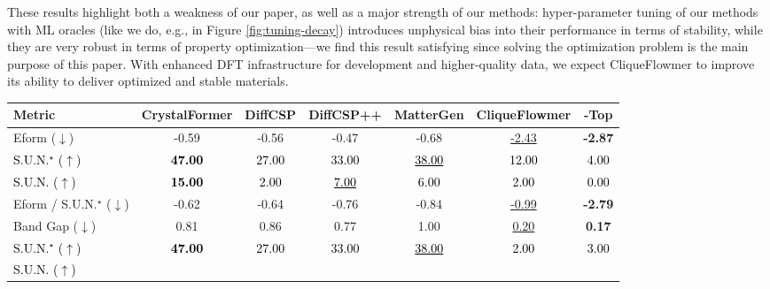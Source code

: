 \documentclass{article}
\theoremstyle{plain}
\theoremstyle{definition}
\theoremstyle{remark}
\begin{document}
These results highlight both a weakness of our paper, as well as a major strength of our methods: hyper-parameter tuning of our methods with ML oracles (like we do, e.g., in Figure \ref{fig:tuning-decay}) introduces unphysical bias into their performance in terms of stability, while they are very robust in terms of property optimization---we find this result satisfying since solving the optimization problem is the main purpose of this paper.
With enhanced DFT infrastructure for development and higher-quality data, we expect CliqueFlowmer to improve its ability to deliver optimized and stable materials. 

\begin{table}[t]
    \centering
    {\small
    \setlength{\tabcolsep}{4pt}
    \begin{tabular}{l|cccc|cc}
        \toprule
        Metric & CrystalFormer & DiffCSP & DiffCSP++ & MatterGen & \textbf{CliqueFlowmer} & \textbf{-Top} \\
        \midrule
        Eform ($\downarrow$)
        & -0.59
        & -0.56
        & -0.47
        & -0.68
        & \underline{-2.43}
        & \textbf{-2.87} \\
        \textcolor{black}{S.U.N.$^\star$ ($\uparrow$)}
        & \textcolor{black}{\textbf{47.00}}
        & \textcolor{black}{27.00}
        & \textcolor{black}{33.00}
        & \textcolor{black}{\underline{38.00}}
        & \textcolor{black}{12.00}
        & \textcolor{black}{4.00} \\
        \textcolor{black}{S.U.N. ($\uparrow$)}
        & \textcolor{black}{\textbf{15.00}}
        & \textcolor{black}{2.00}
        & \textcolor{black}{\underline{7.00}}
        & \textcolor{black}{6.00}
        & \textcolor{black}{2.00}
        & \textcolor{black}{0.00} \\
        Eform / S.U.N.$^\star$ ($\downarrow$)
        & -0.62
        & -0.64
        & -0.76
        & -0.84
        & \underline{-0.99}
        & \textbf{-2.79} \\
        \midrule
        Band Gap ($\downarrow$)
        & 0.81
        & 0.86
        & 0.77
        & 1.00
        & \underline{0.20}
        & \textbf{0.17} \\
        \textcolor{black}{S.U.N.$^\star$ ($\uparrow$)}
        & \textcolor{black}{\textbf{47.00}}
        & \textcolor{black}{27.00}
        & \textcolor{black}{33.00}
        & \textcolor{black}{\underline{38.00}}
        & \textcolor{black}{2.00}
        & \textcolor{black}{3.00} \\
        \textcolor{black}{S.U.N. ($\uparrow$)}

\end{tabular}}
\end{table}
\end{document}
